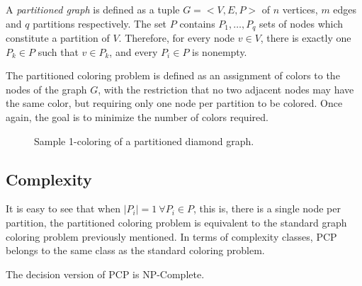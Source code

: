 A \textit{partitioned graph} is defined as a tuple $G = <V,E,P>$ of $n$ vertices, $m$ edges and $q$ partitions respectively. The set $P$ contains $P_1, \ldots ,P_q$ sets of nodes which constitute a partition of $V$. Therefore, for every node $v \in V$, there is exactly one $P_k \in P$ such that $v \in P_k$, and every $P_i \in P$ is nonempty.

The partitioned coloring problem is defined as an assignment of colors to the nodes of the graph $G$, with the restriction that no two adjacent nodes may have the same color, but requiring only one node per partition to be colored. Once again, the goal is to minimize the number of colors required.

\begin{figure}[h]
	\centering
\caption{Sample 1-coloring of a partitioned diamond graph.}
	\label{fig:samplepartitionedcoloring}
\end{figure}

\subsection*{Complexity}

It is easy to see that when $|P_i| = 1\ \forall P_i \in P$, this is, there is a single node per partition, the partitioned coloring problem is equivalent to the standard graph coloring problem previously mentioned. In terms of complexity classes, PCP belongs to the same class as the standard coloring problem.

\begin{theorem}
The decision version of PCP is NP-Complete.
\end{theorem}


